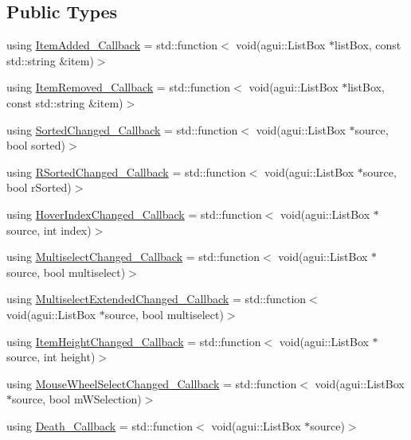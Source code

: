 \subsection*{Public Types}
\begin{DoxyCompactItemize}
\item 
using \mbox{\hyperlink{classec_1_1_generic_list_box_listener_a9dcfd35af8971efa652ced675ac1f28d}{Item\+Added\+\_\+\+Callback}} = std\+::function$<$ void(agui\+::\+List\+Box $\ast$list\+Box, const std\+::string \&item)$>$
\item 
using \mbox{\hyperlink{classec_1_1_generic_list_box_listener_a7a6dd56abe801f89877e1776666a5b11}{Item\+Removed\+\_\+\+Callback}} = std\+::function$<$ void(agui\+::\+List\+Box $\ast$list\+Box, const std\+::string \&item)$>$
\item 
using \mbox{\hyperlink{classec_1_1_generic_list_box_listener_a42ecf66ec6c32bbe9fe0174b2b1a527f}{Sorted\+Changed\+\_\+\+Callback}} = std\+::function$<$ void(agui\+::\+List\+Box $\ast$source, bool sorted)$>$
\item 
using \mbox{\hyperlink{classec_1_1_generic_list_box_listener_a6e2b38bbcd32c3716e7660fc40c4054c}{R\+Sorted\+Changed\+\_\+\+Callback}} = std\+::function$<$ void(agui\+::\+List\+Box $\ast$source, bool r\+Sorted)$>$
\item 
using \mbox{\hyperlink{classec_1_1_generic_list_box_listener_ac1e0c2bb89e7c14f6b201450d372722b}{Hover\+Index\+Changed\+\_\+\+Callback}} = std\+::function$<$ void(agui\+::\+List\+Box $\ast$source, int index)$>$
\item 
using \mbox{\hyperlink{classec_1_1_generic_list_box_listener_a5016e759cd4589d9da453ce353ddc3b2}{Multiselect\+Changed\+\_\+\+Callback}} = std\+::function$<$ void(agui\+::\+List\+Box $\ast$source, bool multiselect)$>$
\item 
using \mbox{\hyperlink{classec_1_1_generic_list_box_listener_afafcf69d328d0d728142a5153e0b9790}{Multiselect\+Extended\+Changed\+\_\+\+Callback}} = std\+::function$<$ void(agui\+::\+List\+Box $\ast$source, bool multiselect)$>$
\item 
using \mbox{\hyperlink{classec_1_1_generic_list_box_listener_aaba7b764c07b0c7cffd9b880bdf46358}{Item\+Height\+Changed\+\_\+\+Callback}} = std\+::function$<$ void(agui\+::\+List\+Box $\ast$source, int height)$>$
\item 
using \mbox{\hyperlink{classec_1_1_generic_list_box_listener_abe17afe409710ad4f15673669a8ebbb3}{Mouse\+Wheel\+Select\+Changed\+\_\+\+Callback}} = std\+::function$<$ void(agui\+::\+List\+Box $\ast$source, bool m\+W\+Selection)$>$
\item 
using \mbox{\hyperlink{classec_1_1_generic_list_box_listener_a121e777735fcbf9e15e147d820e5718e}{Death\+\_\+\+Callback}} = std\+::function$<$ void(agui\+::\+List\+Box $\ast$source)$>$
\end{DoxyCompactItemize}
